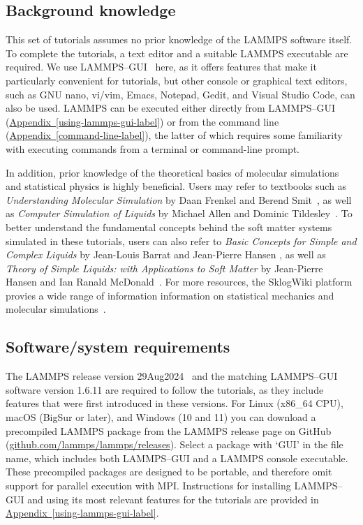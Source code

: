 \documentclass[9pt,tutorial]{livecoms}
\begin{document}
\subsection{Background knowledge}

This set of tutorials assumes no prior knowledge of the LAMMPS software
itself.  To complete the tutorials, a text editor and a suitable LAMMPS
executable are required.  We use LAMMPS--GUI~\cite{lammps_gui_docs}
here, as it offers features that make it particularly convenient for
tutorials, but other console or graphical text editors, such as GNU nano,
vi/vim, Emacs, Notepad, Gedit, and Visual Studio Code, can also be
used.  LAMMPS can be executed either directly from
LAMMPS--GUI (\hyperref[using-lammps-gui-label]{Appendix~\ref{using-lammps-gui-label}})
or from the command line (\hyperref[command-line-label]{Appendix~\ref{command-line-label}}),
the latter of which requires some familiarity with executing commands
from a terminal or command-line prompt.

In addition, prior knowledge of the theoretical basics of molecular
simulations and statistical physics is highly beneficial.  Users may
refer to textbooks such as \textit{Understanding Molecular Simulation} by
Daan Frenkel and Berend Smit~\cite{frenkel2023understanding}, as well as
\textit{Computer Simulation of Liquids} by Michael Allen and Dominic
Tildesley~\cite{allen2017computer}.  To better understand
the fundamental concepts behind the soft matter systems simulated in these
tutorials, users can also refer to \textit{Basic Concepts for Simple and
  Complex Liquids} by Jean-Louis Barrat and Jean-Pierre Hansen
\cite{barrat2003basic}, as well as \textit{Theory of Simple Liquids:
  with Applications to Soft Matter} by Jean-Pierre Hansen and Ian Ranald
McDonald~\cite{hansen2013theory}.  For more resources, the SklogWiki
platform provies a wide range of information information on statistical mechanics
and molecular simulations~\cite{sklogwiki_main_page}. 

\subsection{Software/system requirements}

The LAMMPS release version 29Aug2024~\cite{lammps_code} and the
matching LAMMPS--GUI software version 1.6.11 are required to follow the
tutorials, as they include features that were first introduced in these versions.
For Linux (x86\_64 CPU), macOS (BigSur or later), and Windows (10
and 11) you can download a precompiled LAMMPS package from the LAMMPS
release page on GitHub
(\href{https://github.com/lammps/lammps/releases}{github.com/lammps/lammps/releases}).
Select a package with `GUI' in the file name, which includes
both LAMMPS--GUI and a LAMMPS console executable.  These
precompiled packages are designed to be portable, and therefore omit support for
parallel execution with MPI.  Instructions for installing LAMMPS--GUI and
using its most relevant features for the tutorials are provided in 
\hyperref[using-lammps-gui-label]{Appendix~\ref{using-lammps-gui-label}}.
\end{document}
